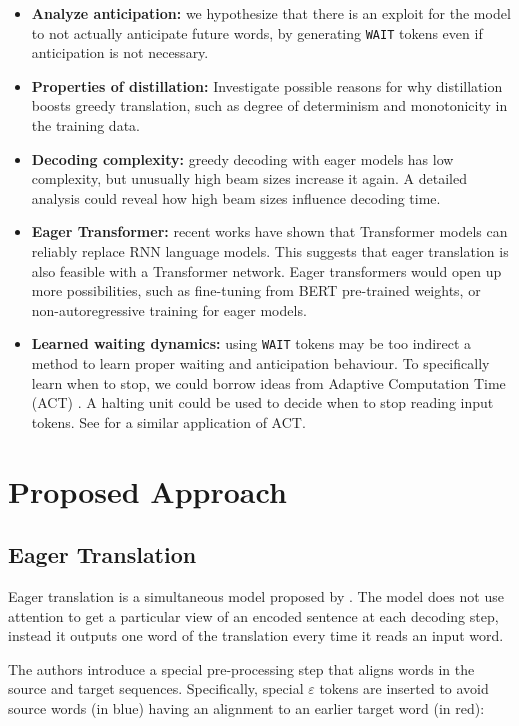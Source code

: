 \documentclass[english]{uzhpub}
\begin{document}
\begin{itemize}
    \item \textbf{Analyze anticipation:} we hypothesize that there is an exploit for the model to not actually anticipate future words, by generating \texttt{WAIT} tokens even if anticipation is not necessary.
    \item \textbf{Properties of distillation:} Investigate possible reasons for why distillation boosts greedy translation, such as degree of determinism and monotonicity in the training data.
    \item \textbf{Decoding complexity:} greedy decoding with eager models has low complexity, but unusually high beam sizes increase it again. A detailed analysis could reveal how high beam sizes influence decoding time.
    \item \textbf{Eager Transformer:} recent works have shown that Transformer models can reliably replace RNN language models. This suggests that eager translation is also feasible with a Transformer network. Eager transformers would open up more possibilities, such as fine-tuning from BERT pre-trained weights, or non-autoregressive training for eager models.
    \item \textbf{Learned waiting dynamics:} using \texttt{WAIT} tokens may be too indirect a method to learn proper waiting and anticipation behaviour. To specifically learn when to stop, we could borrow ideas from Adaptive Computation Time (ACT) \cite{act.graves2016adaptive}. A halting unit could be used to decide when to stop reading input tokens. See  \cite{kreutzer2018c} for a similar application of ACT.
\end{itemize}

\section{Proposed Approach}

\subsection{Eager Translation}


Eager translation is a simultaneous model proposed by \cite{youmaynotneedattention}. The model does not use attention to get a particular view of an encoded sentence at each decoding step, instead it outputs one word of the translation every time it reads an input word.

The authors introduce a special pre-processing step that aligns words in the source and target sequences. Specifically, special $\varepsilon$ tokens are inserted to avoid source words (in blue) having an alignment to an earlier target word (in red):
\end{document}

